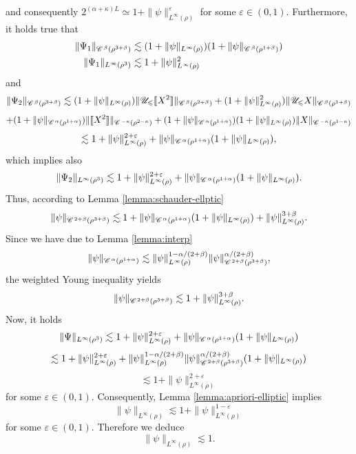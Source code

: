 \documentclass[a4paper,11pt]{article}
\renewcommand{\leq}{\leqslant}
\numberwithin{equation}{section}
\newcommand{\CC}{\mathscr{C} \hspace{.1em}}
\newcommand{\UU}{\mathscr{U}}
\newcommand{\8}{\infty}
\begin{document}
 and consequently $2^{(\alpha+\kappa)L}\simeq 1+ \|\psi\|_{L^\infty(\rho)}^{\varepsilon} $ for some $\varepsilon\in (0,1)$.
% 
Furthermore, it holds true that
\begin{align}\label{eq:psi1}
\begin{aligned}
\| \Psi_1 \|_{\CC^{\beta} (\rho^{3 + \beta})}& \lesssim (1+\|\psi\|_{L^\infty(\rho)})(1+\|\psi\|_{\CC^{\beta}(\rho^{1+\beta})})\\
\| \Psi_1 \|_{L^{\infty} (\rho^3)} &\lesssim  1+
   \| \psi \|^2_{L^{\infty}
   (\rho)}
\end{aligned}
\end{align}
and
   \[ \| \Psi_2 \|_{\CC^{\beta} (\rho^{3 + \beta})} \lesssim (1+\|\psi\|_{L^\infty(\rho)} ) \|\UU_{\leq}\llbracket X^2\rrbracket\|_{\CC^{\beta}(\rho^{2+\beta})}+(1+\|\psi\|^2_{L^\infty(\rho)} ) \|\UU_{\leq} X\|_{\CC^{\beta}(\rho^{1+\beta})}\]
   \[+(1+\|\psi\|_{\CC^\alpha(\rho^{1+\alpha})} ) \|\llbracket X^2\rrbracket\|_{\CC^{-\kappa}(\rho^{2-\kappa})}+(1+\|\psi\|_{\CC^{\alpha}(\rho^{1+\alpha})} )(1+\|\psi\|_{L^\infty(\rho)}) \| X\|_{\CC^{-\kappa}(\rho^{1-\kappa})}\]
   \begin{equation}\label{eq:psi2}
   \lesssim 1+ \|\psi\|_{L^\infty(\rho)}^{2+\varepsilon}+\|\psi\|_{\CC^\alpha(\rho^{1+\alpha})}(1+\|\psi\|_{L^\infty(\rho)}),
   \end{equation}
   which implies also
\begin{equation}\label{eq:psi22}
\| \Psi_2 \|_{L^{\infty} (\rho^3)} \lesssim 1+\|\psi\|_{L^\infty(\rho)}^{2+\varepsilon}+\|\psi\|_{\CC^\alpha(\rho^{1+\alpha})}(1+\|\psi\|_{L^\infty(\rho)}). 
\end{equation}
Thus, according to Lemma \ref{lemma:schauder-ellptic}
\[
\|\psi\|_{\CC^{2+\beta}(\rho^{3+\beta})}\lesssim 1+\|\psi\|_{\CC^\alpha(\rho^{1+\alpha})}(1+\|\psi\|_{L^\infty(\rho)})+\|\psi\|_{L^\infty(\rho)}^{3+\beta} .\]
 Since we have due to Lemma \ref{lemma:interp}
 \[
\|\psi\|_{\CC^{\alpha}(\rho^{1+\alpha})} \lesssim \|\psi\|_{L^\infty(\rho)}^{1-\alpha/(2+\beta)}\|\psi\|^{\alpha/(2+\beta)}_{\CC^{2+\beta}(\rho^{3+\beta})},
\]
the weighted Young inequality yields
\[
\|\psi\|_{\CC^{2+\beta}(\rho^{3+\beta})} \lesssim 1+\|\psi\|_{L^\infty(\rho)}^{3+\beta}.
\]
Now, it holds
 \[ 
 \|\Psi\|_{L^\infty(\rho^3)}\lesssim 1+\|\psi\|_{L^\infty(\rho)}^{2+\varepsilon}
+\|\psi\|_{\CC^\alpha(\rho^{1+\alpha})} (1 + \|\psi\|_{L^\infty(\rho)}) \]
\[
\lesssim 1+\|\psi\|_{L^\infty(\rho)}^{2+\varepsilon}
+\|\psi\|_{L^\infty(\rho)}^{1-\alpha/(2+\beta)}\|\psi\|^{\alpha/(2+\beta)}_{\CC^{2+\beta}(\rho^{3+\beta})}(1 + \|\psi\|_{L^\infty(\rho)})
\]
\begin{equation}\label{eq:psi3}
\lesssim 1+\|\psi\|^{2+\varepsilon}_{L^\infty(\rho)}
\end{equation}
for some $\varepsilon\in (0,1)$.
Consequently, Lemma \ref{lemma:apriori-elliptic} implies 
\[
\|\psi\|_{L^\infty(\rho)}\lesssim 1+ \|\psi\|^{1-\varepsilon}_{L^\infty(\rho)}
\]
for some $\varepsilon\in (0,1)$. Therefore we deduce
\[
   \|\psi\|_{L^\infty(\rho)}\lesssim 1.
   \]
\end{document}
